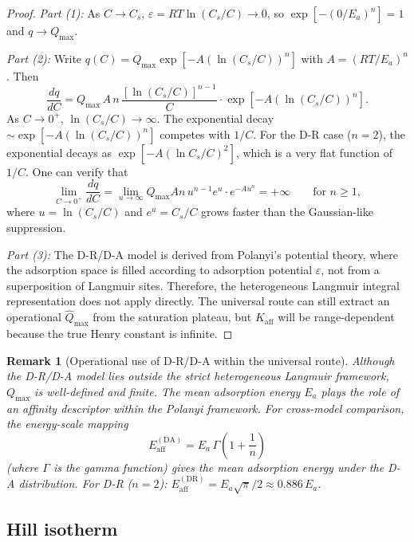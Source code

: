 \documentclass[12pt]{article}
\newtheorem{remark}{Remark}
\begin{document}
\begin{proof}
\textit{Part (1):}
As $C\to C_s$, $\varepsilon = RT\ln(C_s/C) \to 0$, so
$\exp[-(0/E_a)^n] = 1$ and $q\to Q_{\max}$.

\textit{Part (2):}
Write $q(C) = Q_{\max}\exp\![-A(\ln(C_s/C))^n]$ with $A = (RT/E_a)^n$.
Then
\[
  \frac{dq}{dC} = Q_{\max}\,A\,n\,\frac{[\ln(C_s/C)]^{n-1}}{C}
  \cdot\exp\![-A(\ln(C_s/C))^n].
\]
As $C\to 0^+$, $\ln(C_s/C)\to\infty$.  The exponential decay
$\sim\exp[-A(\ln(C_s/C))^n]$ competes with $1/C$.  For the D-R case
($n=2$), the exponential decays as $\exp[-A(\ln C_s/C)^2]$, which is
a very flat function of $1/C$.  One can verify that
\[
  \lim_{C\to 0^+}\frac{dq}{dC}
  = \lim_{u\to\infty} Q_{\max}An\,u^{n-1}e^u \cdot e^{-Au^n} = +\infty
  \qquad\text{for } n\ge 1,
\]
where $u = \ln(C_s/C)$ and $e^u = C_s/C$ grows faster than the
Gaussian-like suppression.

\textit{Part (3):}
The D-R/D-A model is derived from Polanyi's potential theory, where
the adsorption space is filled according to adsorption potential
$\varepsilon$, not from a superposition of Langmuir sites.
Therefore, the heterogeneous Langmuir integral representation
does not apply directly.  The universal route can still extract
an operational $\widehat{Q}_{\max}$ from the saturation plateau,
but $K_{\mathrm{aff}}$ will be range-dependent because the true
Henry constant is infinite.
\end{proof}

\begin{remark}[Operational use of D-R/D-A within the universal route]
Although the D-R/D-A model lies outside the strict heterogeneous
Langmuir framework, $Q_{\max}$ is well-defined and finite.
The mean adsorption energy $E_a$ plays the role of an affinity
descriptor within the Polanyi framework.  For cross-model comparison,
the energy-scale mapping
\begin{equation}
  E_{\mathrm{aff}}^{\mathrm{(DA)}}
  = E_a\,\Gamma\!\left(1 + \frac{1}{n}\right)
  \label{eq:Eaff_DA}
\end{equation}
(where $\Gamma$ is the gamma function) gives the mean adsorption
energy under the D-A distribution.  For D-R ($n=2$):
$E_{\mathrm{aff}}^{\mathrm{(DR)}} = E_a\sqrt{\pi}/2 \approx 0.886\,E_a$.
\end{remark}

\subsection{Hill isotherm}
\end{document}
